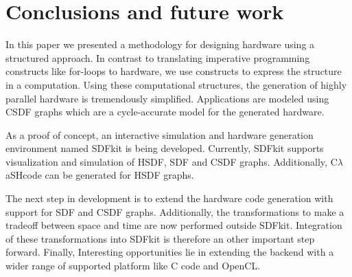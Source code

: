 \documentclass[journal]{IEEEtran}
\newcommand{\clash}{C$\lambda$aSH}
\begin{document}


\section{Conclusions and future work}
\label{sec:conclusions}

  In this paper we presented a methodology for designing hardware using a structured approach.
  In contrast to translating imperative programming constructs like for-loops to hardware, we use constructs to express the structure in a computation.
  Using these computational structures, the generation of highly parallel hardware is tremendously simplified.
  Applications are modeled using CSDF graphs which are a cycle-accurate model for the generated hardware.

  As a proof of concept, an interactive simulation and hardware generation environment named SDFkit is being developed.
  Currently, SDFkit supports visualization and simulation of HSDF, SDF and CSDF graphs.
  Additionally, \clash code can be generated for HSDF graphs.

  The next step in development is to extend the hardware code generation with support for SDF and CSDF graphs.
  Additionally, the transformations to make a tradeoff between space and time are now performed outside SDFkit.
  Integration of these transformations into SDFkit is therefore an other important step forward.
  Finally, Interesting opportunities lie in extending the backend with a wider range of supported platform like C code and OpenCL.
  
\ifCLASSOPTIONcaptionsoff
  \newpage
\fi





%
%
%
\end{document}
